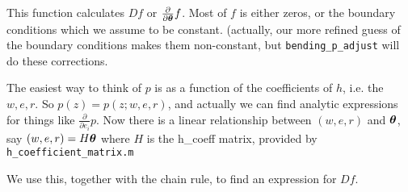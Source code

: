 This function calculates $Df$ or $\frac{\partial}{\partial \boldsymbol{\theta}} f$.
Most of $f$ is either zeros, or the boundary conditions which we assume to
be constant. (actually, our more refined guess of the boundary conditions makes
them non-constant, but \texttt{bending\_p\_adjust} will do these corrections.

The easiest way to think of $p$ is as a function of the coefficients of $h$,
i.e. the $w,e,r$. So $p(z) = p(z;w,e,r)$, and actually we can find analytic
expressions for things like $\frac{\partial}{\partial e_i} p$. Now there is 
a linear relationship between $(w,e,r)$ and $\boldsymbol{\theta}$, say 
$(w,e,r) = H \boldsymbol{\theta}$ where $H$ is the h\_coeff matrix, provided by
\texttt{h\_coefficient\_matrix.m}

We use this, together with the chain rule, to find an expression for $Df$.
